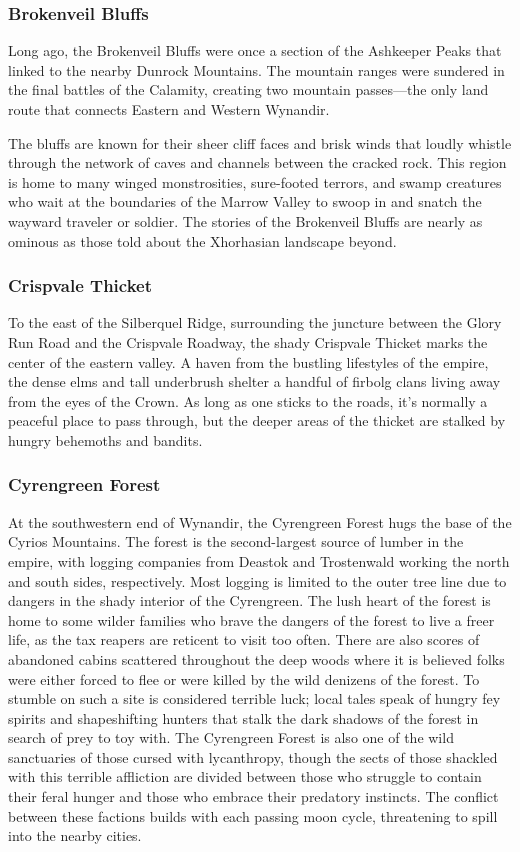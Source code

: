 \documentclass[10pt,a4paper,twoside,bg=print,twocolumn,openany,nodeprecatedcode]{dndbook}
\begin{document}
\subsubsection{Brokenveil Bluffs}
Long ago, the Brokenveil Bluffs were once a section of the Ashkeeper Peaks that linked to the nearby Dunrock Mountains. The mountain ranges were sundered in the final battles of the Calamity, creating two mountain passes—the only land route that connects Eastern and Western Wynandir.

The bluffs are known for their sheer cliff faces and brisk winds that loudly whistle through the network of caves and channels between the cracked rock. This region is home to many winged monstrosities, sure-footed terrors, and swamp creatures who wait at the boundaries of the Marrow Valley to swoop in and snatch the wayward traveler or soldier. The stories of the Brokenveil Bluffs are nearly as ominous as those told about the Xhorhasian landscape beyond.

\subsubsection{Crispvale Thicket}
To the east of the Silberquel Ridge, surrounding the juncture between the Glory Run Road and the Crispvale Roadway, the shady Crispvale Thicket marks the center of the eastern valley. A haven from the bustling lifestyles of the empire, the dense elms and tall underbrush shelter a handful of firbolg clans living away from the eyes of the Crown. As long as one sticks to the roads, it's normally a peaceful place to pass through, but the deeper areas of the thicket are stalked by hungry behemoths and bandits.

\subsubsection{Cyrengreen Forest}
At the southwestern end of Wynandir, the Cyrengreen Forest hugs the base of the Cyrios Mountains. The forest is the second-largest source of lumber in the empire, with logging companies from Deastok and Trostenwald working the north and south sides, respectively. Most logging is limited to the outer tree line due to dangers in the shady interior of the Cyrengreen. The lush heart of the forest is home to some wilder families who brave the dangers of the forest to live a freer life, as the tax reapers are reticent to visit too often. There are also scores of abandoned cabins scattered throughout the deep woods where it is believed folks were either forced to flee or were killed by the wild denizens of the forest. To stumble on such a site is considered terrible luck; local tales speak of hungry fey spirits and shapeshifting hunters that stalk the dark shadows of the forest in search of prey to toy with. The Cyrengreen Forest is also one of the wild sanctuaries of those cursed with lycanthropy, though the sects of those shackled with this terrible affliction are divided between those who struggle to contain their feral hunger and those who embrace their predatory instincts. The conflict between these factions builds with each passing moon cycle, threatening to spill into the nearby cities.
\end{document}
